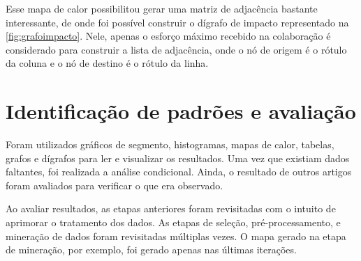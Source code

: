 Esse mapa de calor possibilitou gerar uma matriz de adjacência bastante interessante, de onde foi possível construir o dígrafo de impacto representado na \autoref{fig:grafoimpacto}. Nele, apenas o esforço máximo recebido na colaboração é considerado para construir a lista de adjacência, onde o nó de origem é o rótulo da coluna e o nó de destino é o rótulo da linha.

\section{Identificação de padrões e avaliação}

Foram utilizados gráficos de segmento, histogramas, mapas de calor, tabelas, grafos e dígrafos para ler e visualizar os resultados. Uma vez que existiam dados faltantes, foi realizada a análise condicional. Ainda, o resultado de outros artigos foram avaliados para verificar o que era observado.

Ao avaliar resultados, as etapas anteriores foram revisitadas com o intuito de aprimorar o tratamento dos dados. As etapas de seleção, pré-processamento, e mineração de dados foram revisitadas múltiplas vezes. O mapa gerado na etapa de mineração, por exemplo, foi gerado apenas nas últimas iterações.
